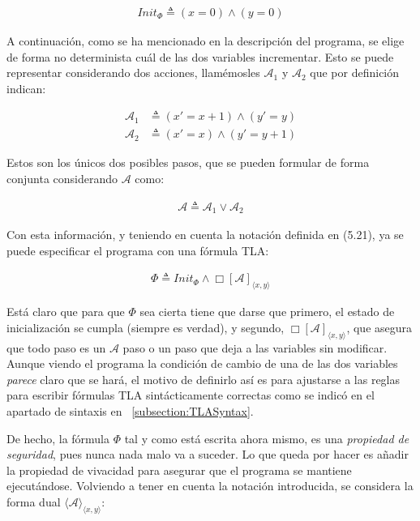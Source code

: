 \begin{align*}
    Init_{\Phi} \triangleq (x = 0) \land (y = 0)
\end{align*}

A continuación, como se ha mencionado en la descripción del programa, se elige de forma no determinista cuál de las dos variables incrementar. Esto se puede representar considerando dos acciones, llamémosles $\mathcal{A}_1$ y $\mathcal{A}_2$ que por definición indican:

\begin{align*}
    \mathcal{A}_1 &\triangleq (x' = x + 1) \land (y' = y) \\
    \mathcal{A}_2 &\triangleq (x' = x) \land (y' = y + 1)
\end{align*}

Estos son los únicos dos posibles pasos, que se pueden formular de forma conjunta considerando $\mathcal{A}$ como:

\begin{align*}
    \mathcal{A} \triangleq \mathcal{A}_1 \lor \mathcal{A}_2
\end{align*}

Con esta información, y teniendo en cuenta la notación definida en (5.21), ya se puede especificar el programa con una fórmula TLA:

\begin{align}
    \Phi \triangleq Init_{\Phi} \land \Box [\mathcal{A}]_{\langle x,y \rangle}
\end{align}

Está claro que para que $\Phi$ sea cierta tiene que darse que primero, el estado de inicialización se cumpla (siempre es verdad), y segundo, $\Box [\mathcal{A}]_{\langle x,y \rangle}$, que asegura que todo paso es un $\mathcal{A}$ paso o un paso que deja a las variables sin modificar. Aunque viendo el programa la condición de cambio de una de las dos variables \textit{parece} claro que se hará, el motivo de definirlo así es para ajustarse a las reglas para escribir fórmulas TLA sintácticamente correctas como se indicó en el apartado de sintaxis en ~\ref{subsection:TLASyntax}.

De hecho, la fórmula $\Phi$ tal y como está escrita ahora mismo, es una \textit{propiedad de seguridad}, pues nunca nada malo va a suceder. Lo que queda por hacer es añadir la propiedad de vivacidad para asegurar que el programa se mantiene ejecutándose. Volviendo a tener en cuenta la notación introducida, se considera la forma dual $\langle \mathcal{A} \rangle_{\langle x,y \rangle}$:

